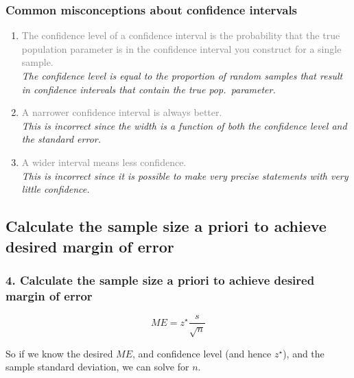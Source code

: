 \documentclass[slidestop,compress,mathserif,12pt,t,professionalfonts,xcolor=table]{beamer}
\begin{document}
\begin{frame}
\frametitle{Common misconceptions about confidence intervals}

\begin{enumerate}

\item \textcolor{gray}{The confidence level of a confidence interval is the
probability that the true population parameter is in the confidence
interval you construct for a single sample.} \\
\textit{The confidence level is equal to the proportion of random samples that result
in confidence intervals that contain the true pop.\ parameter.} \\

\pause

\item \textcolor{gray}{A narrower confidence interval is always better.}\\
\textit{This is incorrect since the width is a function of both the confidence level and 
the standard error.} \\

\pause

\item \textcolor{gray}{A wider interval means less confidence.} \\

\textit{This is incorrect since it is possible to make very precise statements with very 
little confidence.} \\

\end{enumerate}
 
\end{frame}


\subsection{Calculate the sample size a priori to achieve desired margin of error}
\label{mi4}


\begin{frame}
\frametitle{4. Calculate the sample size a priori to achieve desired margin of error}

\vfill

\[ ME = z^\star \frac{s}{\sqrt{n}} \]

So if we know the desired $ME$, and confidence level (and hence $z^\star$),
and the sample standard deviation, we can solve for $n$.

\vfill
 
\end{frame}
\end{document}
